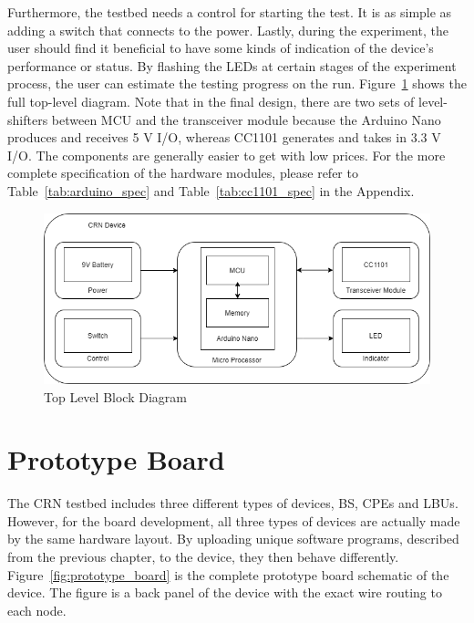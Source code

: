 Furthermore, the testbed needs a control for starting the test. It is as simple as adding a switch that connects to the power. Lastly, during the experiment, the user should find it beneficial to have some kinds of indication of the device's performance or status. By flashing the LEDs at certain stages of the experiment process, the user can estimate the testing progress on the run. Figure~\ref{fig:block_diagram} shows the full top-level diagram. Note that in the final design, there are two sets of level-shifters between MCU and the transceiver module because the Arduino Nano produces and receives 5 V I/O, whereas CC1101 generates and takes in 3.3 V I/O. The components are generally easier to get with low prices. For the more complete specification of the hardware modules, please refer to Table~\ref{tab:arduino_spec} and Table~\ref{tab:cc1101_spec} in the Appendix. 

\begin{figure}[ht]
\centering
\includegraphics[width=12cm]{figures/new_block_diagram.png}
\caption{Top Level Block Diagram}
\label{fig:block_diagram}
\end{figure}


\section{Prototype Board}

The CRN testbed includes three different types of devices, BS, CPEs and LBUs. However, for the board development, all three types of devices are actually made by the same hardware layout. By uploading unique software programs, described from the previous chapter, to the device, they then behave differently. Figure~\ref{fig:prototype_board} is the complete prototype board schematic of the device. The figure is a back panel of the device with the exact wire routing to each node.


